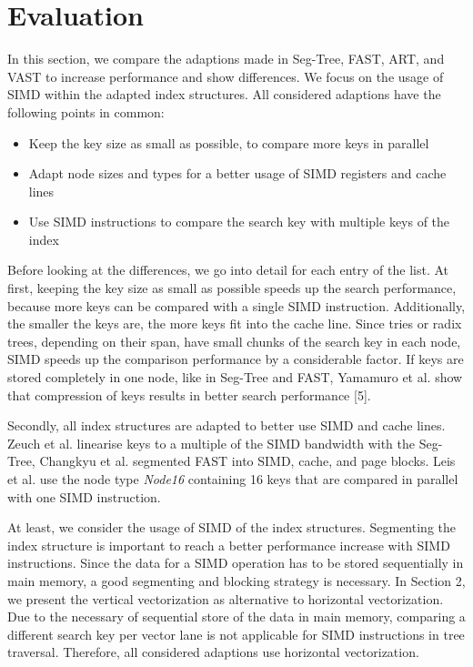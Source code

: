 \documentclass[conference]{IEEEtran}
\begin{document}
\section{Evaluation}
In this section, we compare the adaptions made in Seg-Tree, FAST, ART, and VAST to increase performance and show differences. We focus on the usage of SIMD within the adapted index structures. All considered adaptions have the following points in common:
\begin{itemize}
	\item Keep the key size as small as possible, to compare more keys in parallel
	\item Adapt node sizes and types for a better usage of SIMD registers and cache lines
	\item Use SIMD instructions to compare the search key with multiple keys of the index
\end{itemize}

Before looking at the differences, we go into detail for each entry of the list. At first, keeping the key size as small as possible speeds up the search performance, because more keys can be compared with a single SIMD instruction. Additionally, the smaller the keys are, the more keys fit into the cache line. Since tries or radix trees, depending on their span, have small chunks of the search key in each node, SIMD speeds up the comparison performance by a considerable factor. If keys are stored completely in one node, like in Seg-Tree and FAST, Yamamuro et al. show that compression of keys results in better search performance [5].

Secondly, all index structures are adapted to better use SIMD and cache lines. Zeuch et al. linearise keys to a multiple of the SIMD bandwidth with the Seg-Tree, Changkyu et al. segmented FAST into SIMD, cache, and page blocks. Leis et al. use the node type \emph{Node16} containing 16 keys that are compared in parallel with one SIMD instruction. 

At least, we consider the usage of SIMD of the index structures. Segmenting the index structure is important to reach a better performance increase with SIMD instructions. Since the data for a SIMD operation has to be stored sequentially in main memory, a good segmenting and blocking strategy is necessary. In Section 2, we present the vertical vectorization as alternative to horizontal vectorization. Due to the necessary of sequential store of the data in main memory, comparing a different search key per vector lane is not applicable for SIMD instructions in tree traversal. Therefore, all considered adaptions use horizontal vectorization. 
\end{document}
